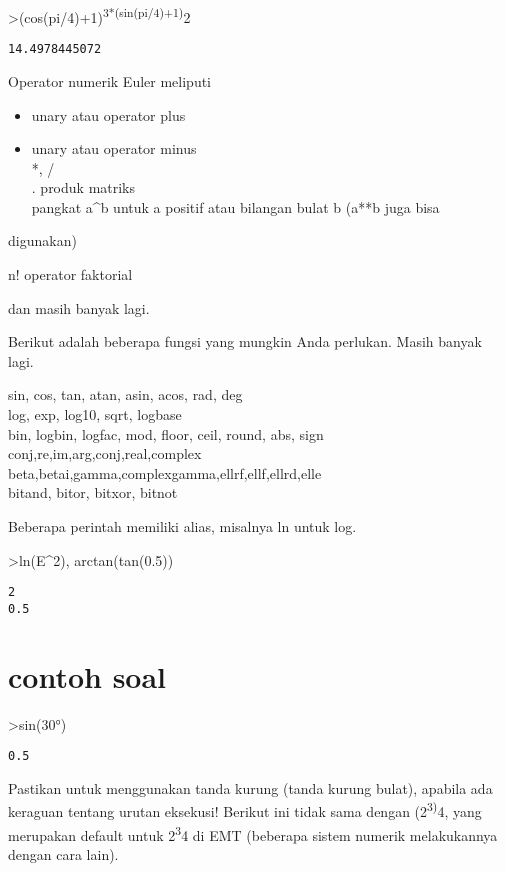 \documentclass[
]{book}
\providecommand{\tightlist}{%
  \setlength{\itemsep}{0pt}\setlength{\parskip}{0pt}}
\begin{document}
\textgreater(cos(pi/4)+1)\textsuperscript{3*(sin(pi/4)+1)}2

\begin{verbatim}
14.4978445072
\end{verbatim}

Operator numerik Euler meliputi

\begin{itemize}
\tightlist
\item
  unary atau operator plus\\
\item
  unary atau operator minus\\
  *, /\\
  . produk matriks\\
  pangkat a\^{}b untuk a positif atau bilangan bulat b (a**b juga bisa
\end{itemize}

digunakan)

n! operator faktorial

dan masih banyak lagi.

Berikut adalah beberapa fungsi yang mungkin Anda perlukan. Masih banyak lagi.

sin, cos, tan, atan, asin, acos, rad, deg\\
log, exp, log10, sqrt, logbase\\
bin, logbin, logfac, mod, floor, ceil, round, abs, sign\\
conj,re,im,arg,conj,real,complex\\
beta,betai,gamma,complexgamma,ellrf,ellf,ellrd,elle\\
bitand, bitor, bitxor, bitnot

Beberapa perintah memiliki alias, misalnya ln untuk log.

\textgreater ln(E\^{}2), arctan(tan(0.5))

\begin{verbatim}
2
0.5
\end{verbatim}

\section{contoh soal}\label{contoh-soal}

\textgreater sin(30°)

\begin{verbatim}
0.5
\end{verbatim}

Pastikan untuk menggunakan tanda kurung (tanda kurung bulat), apabila ada keraguan tentang urutan eksekusi! Berikut ini tidak sama dengan (2\textsuperscript{3)}4, yang merupakan default untuk 2\textsuperscript{3}4 di EMT (beberapa sistem numerik melakukannya dengan cara lain).
\end{document}
